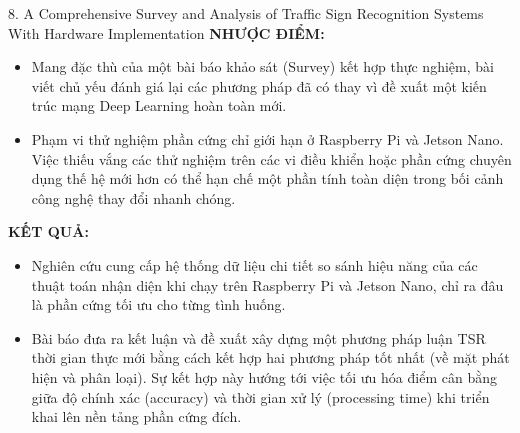 \documentclass[12pt,a4paper]{article}
\newcommand{\subheading}[1]{\vspace{0.3cm}\noindent\textbf{\textcolor{primary}{\MakeUppercase{#1}:}}\par\vspace{0.1cm}}
\begin{document}
\begin{paperbox}{8. A Comprehensive Survey and Analysis of Traffic Sign Recognition Systems With Hardware Implementation}
    \subheading{Nhược điểm}
    \begin{itemize}
        \item Mang đặc thù của một bài báo khảo sát (Survey) kết hợp thực nghiệm, bài viết chủ yếu đánh giá lại các phương pháp đã có thay vì đề xuất một kiến trúc mạng Deep Learning hoàn toàn mới.
        \item Phạm vi thử nghiệm phần cứng chỉ giới hạn ở Raspberry Pi và Jetson Nano. Việc thiếu vắng các thử nghiệm trên các vi điều khiển hoặc phần cứng chuyên dụng thế hệ mới hơn có thể hạn chế một phần tính toàn diện trong bối cảnh công nghệ thay đổi nhanh chóng.
    \end{itemize}

    \subheading{Kết quả}
    \begin{itemize}
        \item Nghiên cứu cung cấp hệ thống dữ liệu chi tiết so sánh hiệu năng của các thuật toán nhận diện khi chạy trên Raspberry Pi và Jetson Nano, chỉ ra đâu là phần cứng tối ưu cho từng tình huống.
        \item Bài báo đưa ra kết luận và đề xuất xây dựng một phương pháp luận TSR thời gian thực mới bằng cách kết hợp hai phương pháp tốt nhất (về mặt phát hiện và phân loại). Sự kết hợp này hướng tới việc tối ưu hóa điểm cân bằng giữa độ chính xác (accuracy) và thời gian xử lý (processing time) khi triển khai lên nền tảng phần cứng đích.
    \end{itemize}
\end{paperbox}
\end{document}
